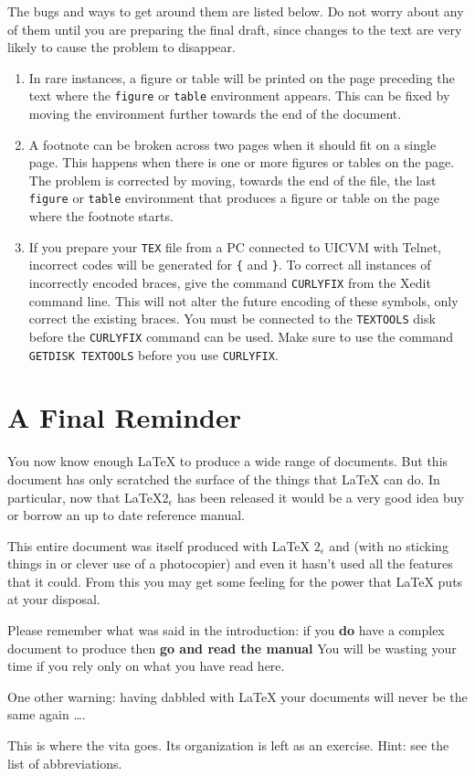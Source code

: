 The bugs and ways to get around them are listed below.  Do not worry
about any of them until you are preparing the final draft, since
changes to the text are very likely to cause the problem to disappear.
\begin{enumerate}
\item In rare instances, a figure or table will be printed on the page
preceding the text where the {\tt figure} or {\tt table} environment
appears.  This can be fixed by moving the environment further
towards the end of the document.
 
\item A footnote can be broken across two pages when it should fit on a
single page.  This happens when there is one or more figures or tables
on the page.  The problem is corrected by moving, towards the end of the
file, the last {\tt figure} or {\tt table} environment that produces a
figure or table on the page where the footnote starts.
 
\item If you prepare your \verb+TEX+ file from a PC connected
to UICVM with Telnet, incorrect codes will be generated for
\verb+{+ and \verb+}+.
To correct all instances of incorrectly encoded braces, give the
command \verb+CURLYFIX+ from the Xedit command line.
This will not alter the future encoding of these symbols, only correct
the existing braces.
You must be connected to the \verb+TEXTOOLS+ disk before the
\verb+CURLYFIX+ command can be used.
Make sure to use the command \verb+GETDISK TEXTOOLS+ before you use
\verb+CURLYFIX+.
\end{enumerate}
 
\chapter{A Final Reminder}
 
You now know enough \LaTeX{} to produce a wide range of documents.
But this document has only scratched the surface of the
things that \LaTeX{} can do. In particular, now that \LaTeX $2_\epsilon$
has been released it would be a very good idea buy or borrow an up to
date reference manual.

This entire document was itself produced with
\LaTeX{} $2_\epsilon$ and \uicthesi{}
(with no sticking things in or clever use of a photocopier) and even
it hasn't used all the features that it could.
From this you may get some
feeling for the power that \LaTeX{} puts at your disposal.
 
Please remember what was said in the introduction: if you {\bf do} have a
complex document to produce then
{\bf go and read the manual}\cite{latex_guide}
You will be wasting your time if you rely only on what you
have read here.
 
One other warning: having
dabbled with \LaTeX{} your documents will never be the same again \ldots.
 
\appendices
\appendix
\newpage

\bibformb

\vita
This is where the vita goes.  Its organization is left as an exercise.
Hint: see the list of abbreviations.